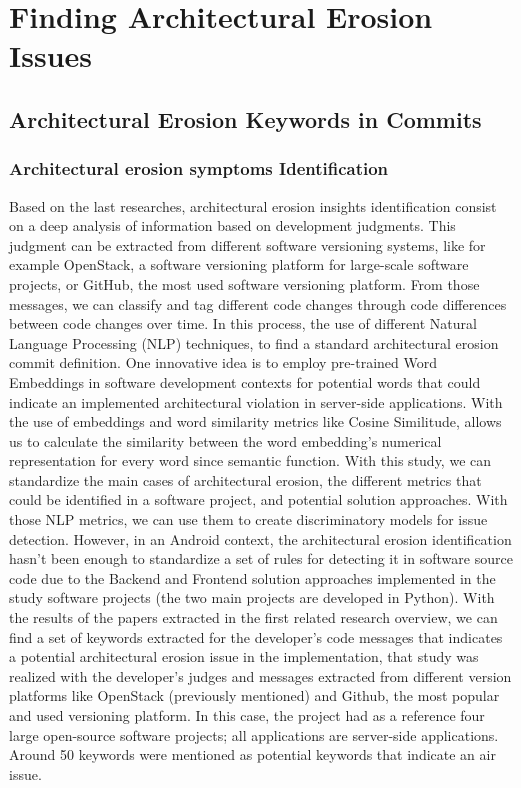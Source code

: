 \chapter{Finding Architectural Erosion Issues}
\label{cha:identification}

\section{Architectural Erosion Keywords in Commits}
\subsection{Architectural erosion symptoms Identification}
Based on the last researches, architectural erosion insights identification consist on a deep analysis of information based on development judgments. This judgment can be extracted from different software versioning systems, like for example OpenStack, a software versioning platform for large-scale software projects, or GitHub, the most used software versioning platform. From those messages, we can classify and tag different code changes through code differences between code changes over time. In this process, the use of different Natural Language Processing (NLP) techniques, to find a standard architectural erosion commit definition. One innovative idea is to employ pre-trained Word Embeddings in software development contexts for potential words that could indicate an implemented architectural violation in server-side applications. With the use of embeddings and word similarity metrics like Cosine Similitude, allows us to calculate the similarity between the word embedding's numerical representation for every word since semantic function. With this study, we can standardize the main cases of architectural erosion, the different metrics that could be identified in a software project, and potential solution approaches.
With those NLP metrics, we can use them to create discriminatory models for issue detection. However, in an Android context, the architectural erosion identification hasn't been enough to standardize a set of rules for detecting it in software source code due to the Backend and Frontend solution approaches implemented in the study software projects (the two main projects are developed in Python).
With the results of the papers extracted in the first related research overview, we can find a set of keywords extracted for the developer's code messages that indicates a potential architectural erosion issue in the implementation, that study was realized with the developer's judges and messages extracted from different version platforms like OpenStack (previously mentioned) and Github, the most popular and used versioning platform. In this case, the project had as a reference four large open-source software projects; all applications are server-side applications. Around 50 keywords were mentioned as potential keywords that indicate an air issue.
